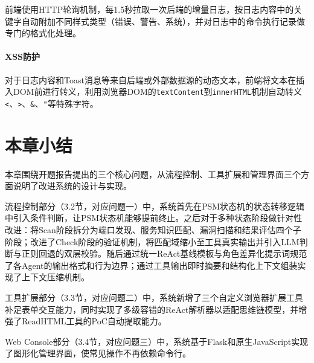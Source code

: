 前端使用HTTP轮询机制，每1.5秒拉取一次后端的增量日志，按日志内容中的关键字自动附加不同样式类型（错误、警告、系统），并对日志中的命令执行记录做专门的格式化处理。

\paragraph{XSS防护}

对于日志内容和Toast消息等来自后端或外部数据源的动态文本，前端将文本在插入DOM前进行转义，利用浏览器DOM的\texttt{textContent}到\texttt{innerHTML}机制自动转义\texttt{<}、\texttt{>}、\texttt{\&}、\texttt{"}等特殊字符。

\section{本章小结}

本章围绕开题报告提出的三个核心问题，从流程控制、工具扩展和管理界面三个方面说明了改进系统的设计与实现。

流程控制部分（3.2节，对应问题一）中，系统首先在PSM状态机的状态转移逻辑中引入条件判断，让PSM状态机能够提前终止。之后对于多种状态阶段做针对性改进：将Scan阶段拆分为端口发现、服务知识匹配、漏洞扫描和结果评估四个子阶段；改进了Check阶段的验证机制，将匹配域缩小至工具真实输出并引入LLM判断与正则回退的双层校验。随后通过统一ReAct基线模板与角色差异化提示词规范了各Agent的输出格式和行为边界；通过工具输出即时摘要和结构化上下文组装实现了上下文压缩机制。

工具扩展部分（3.3节，对应问题二）中，系统新增了三个自定义浏览器扩展工具补足表单交互能力，同时实现了多级容错的ReAct解析器以适配思维链模型，并增强了ReadHTML工具的PoC自动提取能力。

Web Console部分（3.4节，对应问题三）中，系统基于Flask和原生JavaScript实现了图形化管理界面，使常见操作不再依赖命令行。

